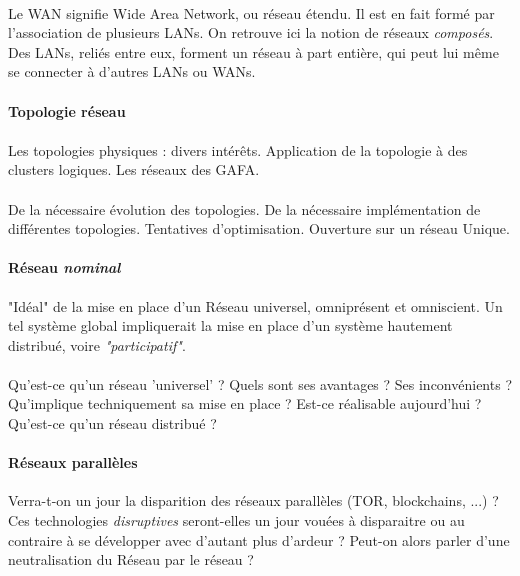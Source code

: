\paragraph{} Le WAN signifie Wide Area Network, ou réseau étendu. Il est en fait formé par
l'association de plusieurs LANs. On retrouve ici la notion de réseaux \emph{composés}. Des LANs,
reliés entre eux, forment un réseau à part entière, qui peut lui même se connecter à d'autres
LANs ou WANs.

\paragraph{Topologie réseau}

\paragraph{} Les topologies physiques : divers intérêts. Application de la topologie à des clusters
logiques. Les réseaux des GAFA.

\paragraph{} De la nécessaire évolution des topologies. De la nécessaire implémentation de différentes topologies.
Tentatives d'optimisation. Ouverture sur un réseau Unique.

\paragraph{Réseau \emph{nominal}} "Idéal" de la mise en place d'un Réseau universel, omniprésent
et omniscient. Un tel système global impliquerait la mise en place d'un système hautement
distribué, voire \emph{"participatif"}.

\paragraph{} Qu'est-ce qu'un réseau 'universel' ? Quels sont ses avantages ? Ses inconvénients ?
Qu'implique techniquement sa mise en place ? Est-ce réalisable aujourd'hui ? Qu'est-ce qu'un réseau distribué ? 

\paragraph{Réseaux parallèles} Verra-t-on un jour la disparition des réseaux parallèles
(TOR, blockchains, ...) ? Ces technologies \emph{disruptives} seront-elles un jour vouées
à disparaitre ou au contraire à se développer avec d'autant plus d'ardeur ? Peut-on alors
parler d'une neutralisation du Réseau par le réseau ?

